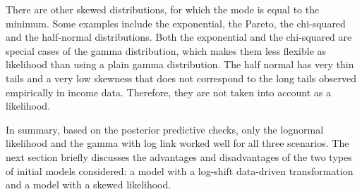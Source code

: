 There are other skewed distributions, for which the mode is equal to the minimum.
Some examples include the exponential, the Pareto, the chi-squared and the half-normal distributions.
Both the exponential and the chi-squared are special cases of the gamma distribution, which makes them less flexible as likelihood than using a plain gamma distribution.
The half normal has very thin tails and a very low skewness that does not correspond to the long tails observed empirically in income data.
Therefore, they are not taken into account as a likelihood.

In summary, based on the posterior predictive checks, only the lognormal likelihood and the gamma with log link worked well for all three scenarios. The next section briefly discusses the advantages and disadvantages of the two types of initial models considered: a model with a log-shift data-driven transformation and a model with a skewed likelihood.

